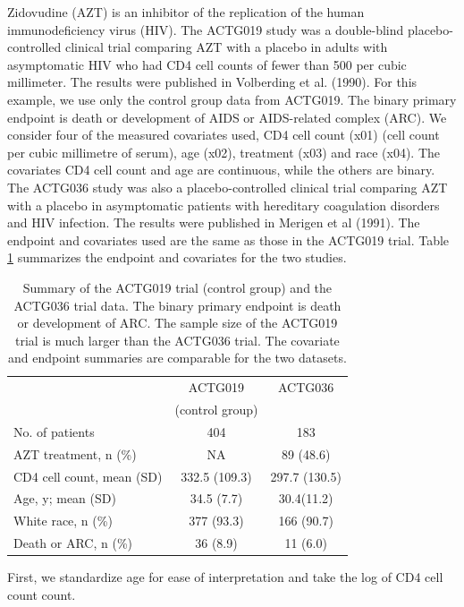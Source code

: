 Zidovudine (AZT) is an inhibitor of the replication of the human immunodeficiency virus (HIV). The ACTG019 study was a double-blind placebo-controlled clinical trial comparing AZT with a placebo in adults with asymptomatic HIV who had CD4 cell counts of fewer than 500 per cubic millimeter. The results were published in Volberding et al. (1990). For this example, we use only the control group data from ACTG019. The binary primary endpoint is death or development of AIDS or AIDS-related complex (ARC). We consider four of the measured covariates used, CD4 cell count (x01) (cell count per cubic millimetre of serum), age (x02), treatment (x03) and race (x04). The covariates CD4 cell count and age are continuous, while the others are binary. The ACTG036 study was also a placebo-controlled clinical trial comparing AZT with a placebo in asymptomatic patients with hereditary coagulation disorders and HIV infection. The results were published in Merigen et al (1991). The endpoint and covariates used are the same as those in the ACTG019 trial. Table \ref{actg} summarizes the endpoint and covariates for the two studies. 



\begin{table}[t!]
\centering
\setlength{\extrarowheight}{3pt}
\begin{tabular}{lcc}
\toprule
& ACTG019  & ACTG036 \\
& (control group) &\\
\midrule
No. of patients & 404 & 183 \\
AZT treatment, n (\%) & NA & 89 (48.6) \\
CD4 cell count, mean (SD)  & 332.5 (109.3) & 297.7 (130.5)\\
Age, y; mean (SD) & 34.5 (7.7)& 30.4(11.2)\\
White race, n (\%)& 377 (93.3)& 166 (90.7)\\
Death or ARC, n (\%)& 36 (8.9) & 11 (6.0)\\
\bottomrule
\end{tabular}
\caption{Summary of the ACTG019 trial (control group) and the ACTG036 trial data. The binary primary endpoint is death or development of ARC. The sample size of the ACTG019 trial is much larger than the ACTG036 trial. The covariate and endpoint summaries are comparable for the two datasets.}
\label{actg}
\end{table}

First, we standardize age for ease of interpretation and take the log of CD4 cell count count. 

